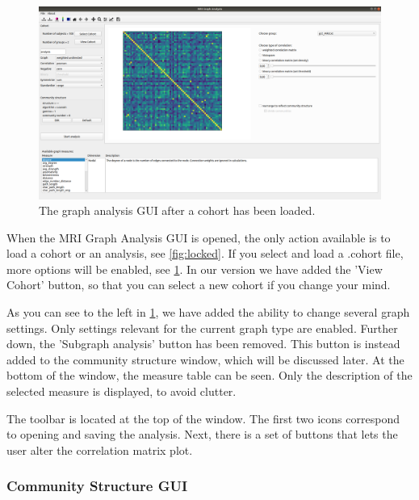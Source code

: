 \documentclass{article}
\begin{document}
\begin{figure}[h]
    \centering
    \includegraphics[width=\linewidth]{graph_analysis_cohort.png}
    \caption{The graph analysis GUI after a cohort has been loaded.}
    \label{fig:started}
\end{figure}

When the MRI Graph Analysis GUI is opened, the only action available is to load a cohort or an analysis, see \cref{fig:locked}. If you select and load a .cohort file, more options will be enabled, see \cref{fig:started}. In our version we have added the 'View Cohort' button, so that you can select a new cohort if you change your mind.

As you can see to the left in \cref{fig:started}, we have added the ability to change several graph settings. Only settings relevant for the current graph type are enabled. Further down, the 'Subgraph analysis' button has been removed. This button is instead added to the community structure window, which will be discussed later. At the bottom of the window, the measure table can be seen. Only the description of the selected measure is displayed, to avoid clutter. 

The toolbar is located at the top of the window. The first two icons correspond to opening and saving the analysis. Next, there is a set of buttons that lets the user alter the correlation matrix plot.

\subsubsection{Community Structure GUI}
\end{document}
